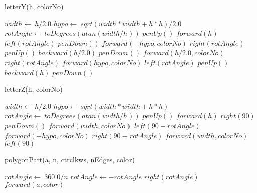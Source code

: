 \documentclass[a4paper,10pt]{article}
\begin{document}
\begin{algorithm}
\caption{letterY(h, colorNo)}
\begin{algorithmic}[5]

\STATE {}
\STATE {}
  \STATE \(width\gets\ h/2.0\)
  \STATE \(hypo\gets\ sqrt(width*width+h*h)/2.0\)
  \STATE \(rotAngle\gets\ toDegrees(atan(width/h))\)
  \STATE \(penUp()\)
  \STATE \(forward(h)\)
  \STATE \(left(rotAngle)\)
  \STATE \(penDown()\)
  \STATE \(forward(-hypo,colorNo)\)
  \STATE \(right(rotAngle)\)
  \STATE \(penUp()\)
  \STATE \(backward(h/2.0)\)
  \STATE \(penDown()\)
  \STATE \(forward(h/2.0,colorNo)\)
  \STATE \(right(rotAngle)\)
  \STATE \(forward(hypo,colorNo)\)
  \STATE \(left(rotAngle)\)
  \STATE \(penUp()\)
  \STATE \(backward(h)\)
  \STATE \(penDown()\)

\end{algorithmic}
\end{algorithm}


\begin{algorithm}
\caption{letterZ(h, colorNo)}
\begin{algorithmic}[5]

\STATE {}
\STATE {}
  \STATE \(width\gets\ h/2.0\)
  \STATE \(hypo\gets\ sqrt(width*width+h*h)\)
  \STATE \(rotAngle\gets\ toDegrees(atan(width/h))\)
  \STATE \(penUp()\)
  \STATE \(forward(h)\)
  \STATE \(right(90)\)
  \STATE \(penDown()\)
  \STATE \(forward(width,colorNo)\)
  \STATE \(left(90-rotAngle)\)
  \STATE \(forward(-hypo,colorNo)\)
  \STATE \(right(90-rotAngle)\)
  \STATE \(forward(width,colorNo)\)
  \STATE \(left(90)\)

\end{algorithmic}
\end{algorithm}


\begin{algorithm}
\caption{polygonPart(a, n, ctrclkws, nEdges, color)}
\begin{algorithmic}[5]

\STATE {}
\STATE {}
  \STATE \(rotAngle\gets\ 360.0/n\)
    \STATE \(rotAngle\gets-rotAngle\)
  \ENDIF
    \STATE \(right(rotAngle)\)
    \STATE \(forward(a,color)\)
  \ENDFOR

\end{algorithmic}
\end{algorithm}
\end{document}
